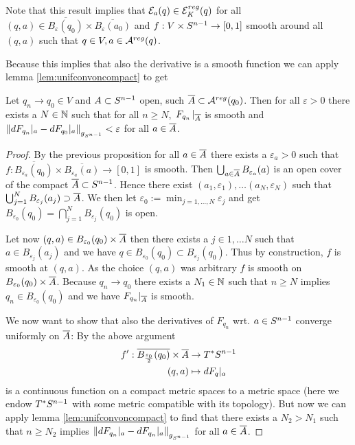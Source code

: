 Note that this result implies that ${\mathcal{E}}_a(q)\in {{\mathcal{E}}^{reg}_K}(q)$ for all $(q,a)\in \overline{B_\varepsilon(q_0)}\times\overline{B_\varepsilon(a_0)}$ and $f:V\times {S^{n-1}} \to [0,1]$ smooth around all $(q,a)$ such that $q\in V, a\in {{\mathcal{A}}^{reg}}(q)$.

Because this implies that also the derivative is a smooth function we can apply lemma \ref{lem:unifconvoncompact} to get
\begin{proposition}\label{prop:dfunifconv}
    Let $q_n\to q_0\in V$ and $A\subset {S^{n-1}}$ open, such ${\overline{A}}\subset {{\mathcal{A}}^{reg}}(q_0)$. Then for all $\varepsilon>0$ there exists a $N\in \mathbb{N}$ such that for all $n \ge N$,  $\left.F_{q_n}\right.\rvert_{\overline{A}}$ is smooth and $\left\lVert dF_{q_n}\rvert_{a} - dF_{q_0}\rvert_{a}\right\rVert_{g_{{S^{n-1}}}}<\varepsilon$ for all $a\in {\overline{A}}$.
\end{proposition}
\begin{proof}
    By the previous proposition for all $a\in {\overline{A}}$ there exists a $\varepsilon_a>0$ such that $f:\overline{B_{\varepsilon_a}(q_0)}\times\overline{B_{\varepsilon_a}(a)}\to [0,1]$ is smooth. Then $\bigcup_{a\in {\overline{A}}} B_{\varepsilon_a}(a)$ is an open cover of the compact ${\overline{A}}\subset {S^{n-1}}$. Hence there exist $(a_1,\varepsilon_1),\dots (a_N,\varepsilon_N)$ such that $\bigcup_{j=1}^N B_{\varepsilon_j}(a_j) \supset {\overline{A}}$. We then let $\varepsilon_0 := \min_{j=1,\dots, N} \varepsilon_j$ and get $B_{\varepsilon_0}(q_0) = \bigcap_{j=1}^N B_{\varepsilon_j}(q_0)$ is open. 

    Let now $(q,a) \in B_{\varepsilon_0}(q_0)\times{\overline{A}}$ then there exists a $j\in {1,\dots N}$ such that $a\in B_{\varepsilon_j}(a_j)$ and we have $q\in B_{\varepsilon_0}(q_0)\subset B_{\varepsilon_j}(q_0)$. Thus by construction, $f$ is smooth at $(q,a)$. As the choice $(q,a)$ was arbitrary $f$ is smooth on $B_{\varepsilon_0}(q_0)\times{\overline{A}}$. Because $q_n\to q_0$ there exists a $N_1\in \mathbb{N}$ such that $n\ge N$ implies $q_n\in B_{\varepsilon_0}(q_0)$ and we have $F_{q_n}\rvert_{{\overline{A}}}$ is smooth.

    We now want to show that also the derivatives of $F_{q_n}$ wrt. $a\in {S^{n-1}}$ converge uniformly on ${\overline{A}}$:
    By the above argument 
    \begin{align*}
        f':{\overline{B_{\frac{\varepsilon_0}{2}}(q_0)}}\times {\overline{A}} &\to T^*{S^{n-1}} \\
        (q,a)&\mapsto dF_q\rvert_a
    \end{align*}
    is a continuous function on a compact metric spaces to a metric space (here we endow $T^*{S^{n-1}}$ with some metric compatible with its topology). 
    But now we can apply lemma \ref{lem:unifconvoncompact} to find that there exists a $N_2>N_1$ such that $n\ge N_2$ implies $\left\lVert dF_{q_n}\rvert_{a} - dF_{q_n}\rvert_{a}\right\rVert_{g_{{S^{n-1}}}}$ for all $a\in {\overline{A}}$.
\end{proof}

